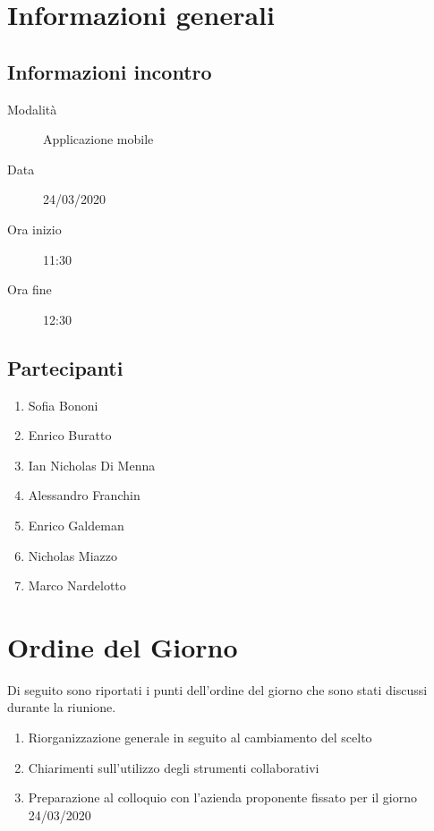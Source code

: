 \documentclass{article}
\begin{document}


\section{Informazioni generali}%
\label{sec:informazioni_generali}

\subsection{Informazioni incontro}%
\label{sub:informazioni_incontro}

\begin{description}
  \item[Modalità] Applicazione mobile 
  \item[Data] 24/03/2020
  \item[Ora inizio] 11:30
  \item[Ora fine] 12:30
\end{description}

\subsection{Partecipanti}%
\label{sub:partecipanti}

\begin{enumerate}
  \item Sofia Bononi
  \item Enrico Buratto
  \item Ian Nicholas Di Menna
  \item Alessandro Franchin
  \item Enrico Galdeman
  \item Nicholas Miazzo
  \item Marco Nardelotto
\end{enumerate}

\section{Ordine del Giorno}%
\label{ordine_del_giorno}
Di seguito sono riportati i punti dell'ordine del giorno che sono stati discussi durante la riunione.
\begin{enumerate}
  \item Riorganizzazione generale in seguito al cambiamento del  scelto
  \item Chiarimenti sull'utilizzo degli strumenti collaborativi
  \item Preparazione al colloquio con l'azienda proponente fissato per il giorno 24/03/2020
\end{enumerate}
\end{document}
